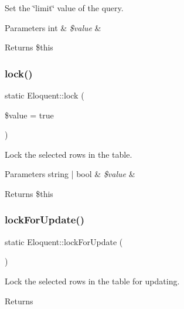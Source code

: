 Set the \char`\"{}limit\char`\"{} value of the query.


\begin{DoxyParams}[1]{Parameters}
int & {\em \$value} & \\
\hline
\end{DoxyParams}
\begin{DoxyReturn}{Returns}
\$this 
\end{DoxyReturn}
\mbox{\label{class_eloquent_a99a6223b6ef3008aff9b1d113f67449f}} 
\subsubsection{\texorpdfstring{lock()}{lock()}}
{\footnotesize\ttfamily static Eloquent\+::lock (\begin{DoxyParamCaption}\item[{}]{\$value = {\ttfamily true} }\end{DoxyParamCaption})\hspace{0.3cm}{\ttfamily [static]}}

Lock the selected rows in the table.


\begin{DoxyParams}[1]{Parameters}
string | bool & {\em \$value} & \\
\hline
\end{DoxyParams}
\begin{DoxyReturn}{Returns}
\$this 
\end{DoxyReturn}
\mbox{\label{class_eloquent_a8424881c1216eeb0bf339b38c713a090}} 
\subsubsection{\texorpdfstring{lock\+For\+Update()}{lockForUpdate()}}
{\footnotesize\ttfamily static Eloquent\+::lock\+For\+Update (\begin{DoxyParamCaption}{ }\end{DoxyParamCaption})\hspace{0.3cm}{\ttfamily [static]}}

Lock the selected rows in the table for updating.

\begin{DoxyReturn}{Returns}

\end{DoxyReturn}
\mbox{\label{class_eloquent_a8839c902460bd7744993f61693711cf7}} 
